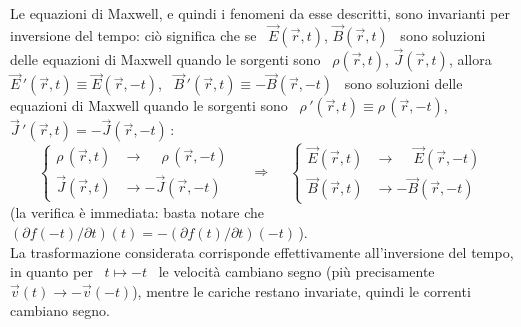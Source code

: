 Le equazioni di Maxwell, e quindi i fenomeni da esse descritti, sono invarianti
per inversione del tempo: ci\`o significa che se \ $\vec E(\vec r,t)$,
$\vec B(\vec r,t)$ \ sono soluzioni delle equazioni di Maxwell quando le
sorgenti sono \ $\rho(\vec r,t)$, $\vec J(\vec r,t)$, allora
\ $\vec E\,'(\vec r,t)\equiv\vec E(\vec r,-t)$,
\ $\vec B\,'(\vec r,t)\equiv-\vec B(\vec r,-t)$ \ sono soluzioni delle equazioni
di Maxwell quando le sorgenti sono \ $\rho\,'(\vec r,t)\equiv\rho\,(\vec r,-t)$,
\ $\vec J\,'(\vec r,t)=-\vec J(\vec r,-t)$\,:
\begin{equation}
  \left\{\begin{aligned}
    \rho\,(\vec r,t)&\to\phantom{-}\rho\,(\vec r,-t)\\
    \vec J(\vec r,t)&\to-\vec J(\vec r,-t)
  \end{aligned}\right.
  \quad\ \Rightarrow\quad\
  \left\{\begin{aligned}
    \vec E(\vec r,t)&\to\phantom{-}\vec E(\vec r,-t)\\
    \vec B(\vec r,t)&\to-\vec B(\vec r,-t)
  \end{aligned}\right.
  \tag{7.69}
\end{equation}
\big(la verifica \`e immediata: basta notare che
\ $(\partial f(-t)/\partial t)(t)=-(\partial f(t)/\partial t)(-t)$\,\big).\\
La trasformazione considerata corrisponde effettivamente all'inversione del
tempo, in quanto per \ $t\mapsto-t$ \ le velocit\`a cambiano segno \big(pi\`u
precisamente \ $\vec v(t)\to-\vec v(-t)$\big), mentre le cariche restano
invariate, quindi le correnti cambiano segno.


